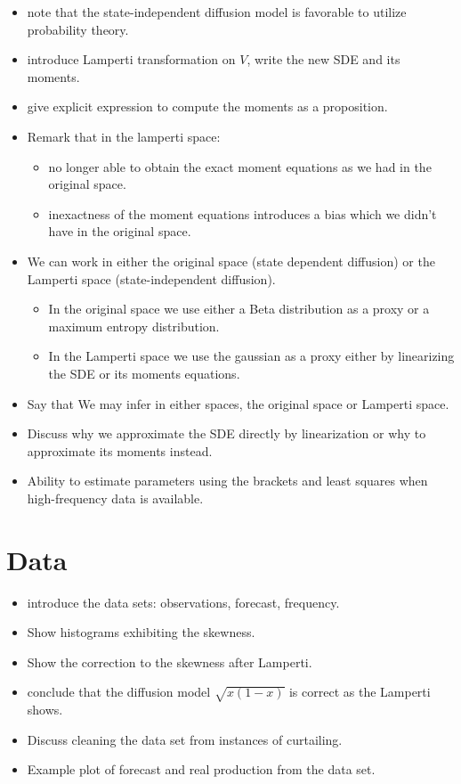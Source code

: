 \documentclass[10pt,twocolumn,letterpaper]{article}
\begin{document}
\begin{itemize}
    \item note that the state-independent diffusion model is favorable to utilize probability theory.
    \item introduce Lamperti transformation on $V$, write the new SDE and its moments.
    \item give explicit expression to compute the moments as a proposition.
    \item Remark that in the lamperti space:
    \begin{itemize}
        \item no longer able to obtain the exact moment equations as we had in the original space.
        \item inexactness of the moment equations introduces a bias which we didn't have in the original space.
    \end{itemize}
    \item We can work in either the original space (state dependent diffusion) or the Lamperti space (state-independent diffusion).
    \begin{itemize}
        \item In the original space we use either a  Beta distribution as a proxy or a maximum entropy distribution.
        \item In the Lamperti space we use the gaussian as a proxy either by linearizing the SDE or its moments equations.
    \end{itemize}
    \item Say that We may infer in either spaces, the original space or Lamperti space.
    \item Discuss why we approximate the SDE directly by linearization or why to approximate its moments instead.
    \item Ability to estimate parameters using the brackets and least squares when high-frequency data is available.

\end{itemize}



\section{Data}

\begin{itemize}
    \item introduce the data sets: observations, forecast, frequency.
    \item Show histograms exhibiting the skewness.
    \item Show the correction to the skewness after Lamperti.
    \item conclude that the diffusion model $\sqrt{x(1-x)}$ is correct as the Lamperti shows.
    \item Discuss cleaning the data set from instances of curtailing.
    \item Example plot of forecast and real production from the data set.
\end{itemize}
\end{document}
